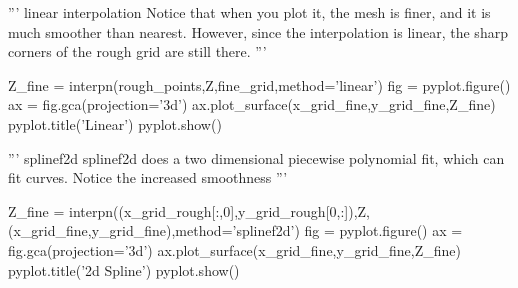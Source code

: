 \begin{codeexample}
\begin{VerbatimOut}{\listingFile}
'''
linear interpolation
Notice that when you plot it, the mesh is finer, and it is much
smoother than nearest.
However, since the interpolation is linear, the sharp corners of the
rough grid are still there.
'''

Z_fine = interpn(rough_points,Z,fine_grid,method='linear')
fig = pyplot.figure()
ax = fig.gca(projection='3d')
ax.plot_surface(x_grid_fine,y_grid_fine,Z_fine)
pyplot.title('Linear')
pyplot.show()

'''
splinef2d
splinef2d does a two dimensional piecewise polynomial fit,
which can fit curves. Notice the increased smoothness
'''

Z_fine = interpn((x_grid_rough[:,0],y_grid_rough[0,:]),Z,(x_grid_fine,y_grid_fine),method='splinef2d')
fig = pyplot.figure()
ax = fig.gca(projection='3d')
ax.plot_surface(x_grid_fine,y_grid_fine,Z_fine)
pyplot.title('2d Spline')
pyplot.show()
\end{VerbatimOut}
\end{codeexample}


